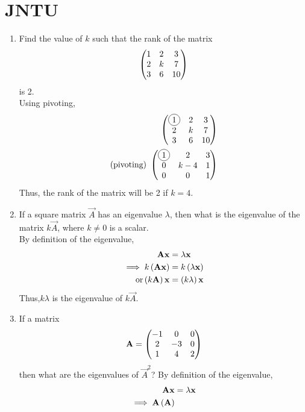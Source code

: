 \documentclass[journal,12pt,twocolumn]{IEEEtran}
\renewcommand\thesection{\arabic{section}}
\begin{document}
\section{JNTU}
\renewcommand{\theequation}{\theenumi}
\begin{enumerate}[label=\thesection.\arabic*.,ref=\thesection.\theenumi]
\item Find the value of $k$ such that the rank of the matrix
\begin{align}
	\begin{pmatrix}1 & 2 & 3\\2 & k & 7 \\ 3 & 6 & 10\end{pmatrix} 
\end{align}
is 2.
\\
\solution Using pivoting,
\begin{align}
	\myvec{\circled{1} & 2 & 3\\2 & k & 7 \\ 3 & 6 & 10} 
	\\
	\text{(pivoting) }	
	\myvec{\circled{1} & 2 & 3\\0 & k-4 & 1 \\ 0 & 0 & 1} 
\end{align}
Thus, the rank of the matrix will be 2 if $k = 4$.
\item If a square matrix $\vec{A}$ has an eigenvalue $\lambda $, then what is the eigenvalue of the matrix $k\vec{A}$, where $k \ne 0$ is a scalar.
	\\
		\solution By definition of the eigenvalue, 
\begin{align}
	\mathbf{A}
	\mathbf{x} &= \lambda
	\mathbf{x}
\\
	\implies
k	\left(\mathbf{A}
	\mathbf{x}\right) &= k\left(\lambda
	\mathbf{x}\right) 	\\
	\text{or} 
	\left(k\mathbf{A}\right)
	\mathbf{x} &= \left(k\lambda\right)
	\mathbf{x}
\end{align}
		Thus,$k\lambda$ is the eigenvalue of $k\vec{A}$.
\item If a matrix 
\begin{align}
	\mathbf{A} = 	\begin{pmatrix}-1 & 0 & 0\\2 & -3 & 0 \\ 1 & 4 & 2\end{pmatrix}
\end{align}
then what are the eigenvalues of $\vec{A}^2$?
		\solution By definition of the eigenvalue, 
\begin{align}
	\mathbf{A}
	\mathbf{x} &= \lambda
	\mathbf{x}
\\
	\implies
	\mathbf{A}
	\left(\mathbf{A}
\right)
\end{align}
\end{enumerate}
\end{document}
